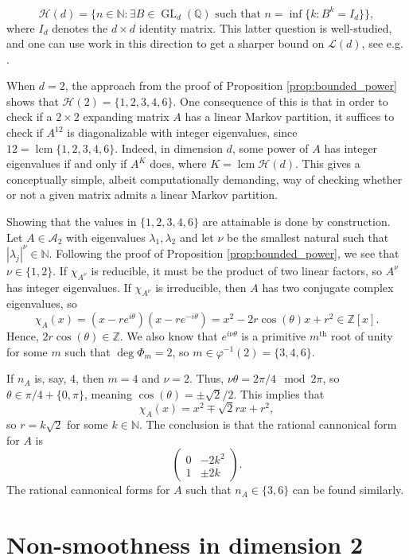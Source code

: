 \documentclass{article}
\def\N{\mathbb{N}}
\def\Q{\mathbb{Q}}
\def\Z{\mathbb{Z}}
\def\lcm{\operatorname{lcm}}
\newcommand{\abs}[1]{\left\vert{#1}\right\vert}
\newcommand{\set}[1]{\{ #1 \}}
\newcommand{\mtr}[1]{\begin{pmatrix} #1 \end{pmatrix}}
\begin{document}
$$
    \mathcal{H}(d)=\big\{n\in \N:\exists B\in \operatorname{GL}_d(\Q) \text{ such that } n=\inf \{k:B^k=I_d\}\big\},
$$
where $I_d$ denotes the $d\times d$ identity matrix. This latter question is well-studied, and one can use work in this direction to get a sharper bound on $\mathcal{L}(d)$, see e.g. \cite{KP, K}.

When $d=2$, the approach from the proof of Proposition \ref{prop:bounded_power} shows that $\mathcal{H}(2)= \set{1,2,3,4,6}$. One consequence of this is that in order to check if a $2\times 2$ expanding matrix $A$ has a linear Markov partition, it suffices to check if $A^{12}$ is diagonalizable with integer eigenvalues, since $12 = \lcm \set{1,2,3,4,6}$. Indeed, in dimension $d$, some power of $A$ has integer eigenvalues if and only if $A^K$ does, where $K=\lcm\mathcal{H}(d)$. This gives a conceptually simple, albeit computationally demanding, way of checking whether or not a given matrix admits a linear Markov partition. 

Showing that the values in $\set{1,2,3,4,6}$ are attainable is done by construction. Let $A\in \mathcal{A}_2$ with eigenvalues $\lambda_1,\lambda_2$ and let $\nu$ be the smallest natural such that $\abs{\lambda_j}^\nu \in \N$. Following the proof of Proposition \ref{prop:bounded_power}, we see that $\nu \in \set{1,2}$. If $\chi_{A^\nu}$ is reducible, it must be the product of two linear factors, so $A^\nu$ has integer eigenvalues. If $\chi_{A^\nu}$ is irreducible, then $A$ has two conjugate complex eigenvalues, so
$$
    \chi_A(x) = (x-re^{i\theta})(x-re^{-i\theta}) = x^2 - 2r\cos(\theta) x + r^2\in \Z[x].
$$
Hence, $2r\cos(\theta) \in \Z$. We also know that $e^{i\nu \theta}$ is a primitive $m^\text{th}$ root of unity for some $m$ such that $\deg\Phi_m = 2$, so $m \in \varphi^{-1}(2) = \set{3,4,6}$. 

If $n_A$ is, say, $4$, then $m = 4$ and $\nu = 2$. Thus, $\nu \theta = 2\pi/4 \mod 2\pi$, so $\theta \in \pi/4 + \set{0,\pi}$, meaning $\cos(\theta) = \pm\sqrt2/2$. This implies that
$$
    \chi_A(x) = x^2 \mp \sqrt 2 r x + r^2,
$$
so $r = k \sqrt 2$ for some $k \in \N$. The conclusion is that the rational cannonical form for $A$ is
$$
    \mtr{0&-2k^2\\ 1 & \pm2k}.
$$
The rational cannonical forms for $A$ such that $n_A \in \set{3,6}$ can be found similarly.

\section{Non-smoothness in dimension 2} \label{Section:NonSmooth}
\end{document}
